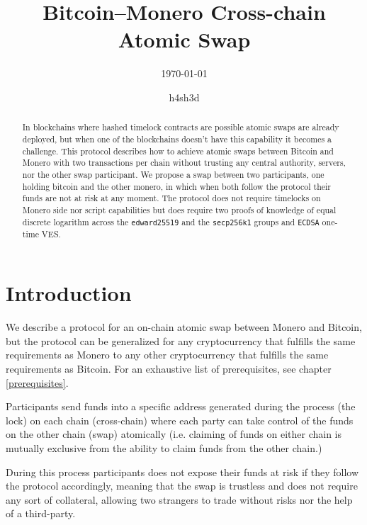 \documentclass{llncs}
\begin{document}
\title{Bitcoin--Monero Cross-chain Atomic Swap}
\author{h4sh3d}

\subtitle{{\normalsize\today}}

\maketitle

\begin{abstract}
    In blockchains where hashed timelock contracts are possible atomic swaps are already deployed, but when one of the blockchains doesn't have this capability it becomes a challenge. This protocol describes how to achieve atomic swaps between Bitcoin and Monero with two transactions per chain without trusting any central authority, servers, nor the other swap participant.
    We propose a swap between two participants, one holding bitcoin and the other monero, in which when both follow the protocol their funds are not at risk at any moment. The protocol does not require timelocks on Monero side nor script capabilities but does require two proofs of knowledge of equal discrete logarithm across  the \texttt{edward25519} and the \texttt{secp256k1} groups and \texttt{ECDSA} one-time VES.
\end{abstract}

\section{Introduction}
We describe a protocol for an on-chain atomic swap between Monero and Bitcoin, but the protocol can be generalized for any cryptocurrency that fulfills the same requirements as Monero to any other cryptocurrency that fulfills the same requirements as Bitcoin. For an exhaustive list of prerequisites, see chapter \ref{prerequisites}.

Participants send funds into a specific address generated during the process (the lock) on each chain (cross-chain) where each party can take control of the funds on the other chain (swap) atomically (i.e. claiming of funds on either chain is mutually exclusive from the ability to claim funds from the other chain.)

During this process participants does not expose their funds at risk if they follow the protocol accordingly, meaning that the swap is trustless and does not require any sort of collateral, allowing two strangers to trade without risks nor the help of a third-party.
\end{document}
